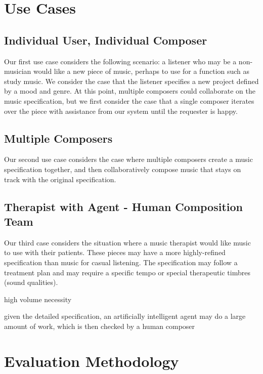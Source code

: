 \documentclass[final,authoryear,5p,times,twocolumn]{elsarticle}
\begin{document}
\section{Use Cases}

\subsection{Individual User, Individual Composer}


Our first use case considers the following scenario: a listener who may be a non-musician would like a new piece of music, perhaps to use for a function such as study music. We consider the case that the listener specifies a new project defined by a mood and genre. At this point, multiple composers could collaborate on the music specification, but we first consider the case that a single composer iterates over the piece with assistance from our system until the requester is happy.

\subsection{Multiple Composers}



Our second use case considers the case where multiple composers create a music specification together, and then collaboratively compose music that stays on track with the original specification.


\subsection{Therapist with Agent - Human Composition Team}


Our third case considers the situation where a music therapist would like music to use with their patients. These pieces may have a more highly-refined specification than music for casual listening. The specification may follow a treatment plan and may require a specific tempo or special therapeutic timbres (sound qualities).

high volume necessity

given the detailed specification, an artificially intelligent agent may do a large amount of work, which is then checked by a human composer

\section{Evaluation Methodology}
\end{document}
